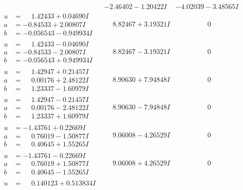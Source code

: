 \documentclass[1p]{elsarticle_modified}
\theoremstyle{definition}
\begin{document}
$$\begin{array}{c|c|c}
 & -2.46402 - 1.20422 I & -4.02039 - 3.48565 I \\ \hline\begin{aligned}
u &= \phantom{-}1.42433 + 0.04690 I \\
a &= -0.84533 + 2.00807 I \\
b &= -0.056543 - 0.949934 I\end{aligned}
 & \phantom{-}8.82467 + 3.19321 I & \phantom{-0.000000 } 0 \\ \hline\begin{aligned}
u &= \phantom{-}1.42433 - 0.04690 I \\
a &= -0.84533 - 2.00807 I \\
b &= -0.056543 + 0.949934 I\end{aligned}
 & \phantom{-}8.82467 - 3.19321 I & \phantom{-0.000000 } 0 \\ \hline\begin{aligned}
u &= \phantom{-}1.42947 + 0.21457 I \\
a &= \phantom{-}0.00176 + 2.48122 I \\
b &= \phantom{-}1.23337 - 1.60979 I\end{aligned}
 & \phantom{-}8.90630 + 7.94848 I & \phantom{-0.000000 } 0 \\ \hline\begin{aligned}
u &= \phantom{-}1.42947 - 0.21457 I \\
a &= \phantom{-}0.00176 - 2.48122 I \\
b &= \phantom{-}1.23337 + 1.60979 I\end{aligned}
 & \phantom{-}8.90630 - 7.94848 I & \phantom{-0.000000 } 0 \\ \hline\begin{aligned}
u &= -1.43761 + 0.22669 I \\
a &= \phantom{-}0.76019 - 1.50877 I \\
b &= \phantom{-}0.40645 + 1.55265 I\end{aligned}
 & \phantom{-}9.06008 - 4.26529 I & \phantom{-0.000000 } 0 \\ \hline\begin{aligned}
u &= -1.43761 - 0.22669 I \\
a &= \phantom{-}0.76019 + 1.50877 I \\
b &= \phantom{-}0.40645 - 1.55265 I\end{aligned}
 & \phantom{-}9.06008 + 4.26529 I & \phantom{-0.000000 } 0 \\ \hline\begin{aligned}
u &= \phantom{-}0.140123 + 0.513834 I \\

\end{aligned}
\end{array}$$
\end{document}
